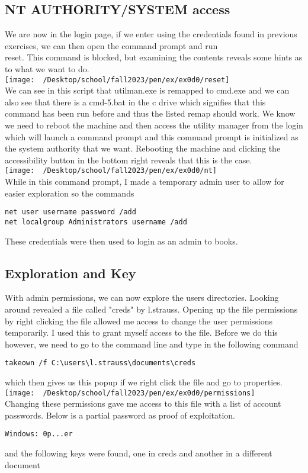 \documentclass[notitlepage]{article}
\begin{document}
   \subsection{NT AUTHORITY/SYSTEM access}
    We are now in the login page, if we enter using the credentials found in previous exercises, we can then open the command prompt and run {\\}reset.
    This command is blocked, but examining the contents reveals some hints as to what we want to do. \\
\texttt{[image: ~/Desktop/school/fall2023/pen/ex/ex0d0/reset]} \\
    We can see in this script that utilman.exe is remapped to cmd.exe and we can also see that there is a cmd-5.bat in the c drive which signifies that this 
    command has been run before and thus the listed remap should work. We know we need to reboot the machine and then access the utility manager from the login 
    which will launch a command prompt and this command prompt is initialized as the system authority that we want. Rebooting the machine and clicking the 
    accessibility button in the bottom right reveals that this is the case. \\
\texttt{[image: ~/Desktop/school/fall2023/pen/ex/ex0d0/nt]} \\
    While in this command prompt, I made a temporary admin user to allow for easier exploration so the commands
\begin{verbatim}
net user username password /add
net localgroup Administrators username /add
\end{verbatim}
    These credentials were then used to login as an admin to books.
    
    \subsection{Exploration and Key}
    With admin permissions, we can now explore the users directories. Looking around revealed a file called "creds" by l.strauss. Opening up the 
    file permissions by right clicking the file allowed me access to change the user permissions temporarily. I used this to grant myself access to the file.
    Before we do this however, we need to go to the command line and type in the following command
    \begin{verbatim}
takeown /f C:\users\l.strauss\documents\creds
    \end{verbatim}
    which then gives us this popup if we right click the file and go to properties.
\texttt{[image: ~/Desktop/school/fall2023/pen/ex/ex0d0/permissions]} \\
   Changing these permissions gave me access to this file with a list of account passwords. Below is a partial password as proof of exploitation.
   \begin{verbatim}
Windows: 0p...er
   \end{verbatim}
    and the following keys were found, one in creds and another in a different document
    
\end{document}
